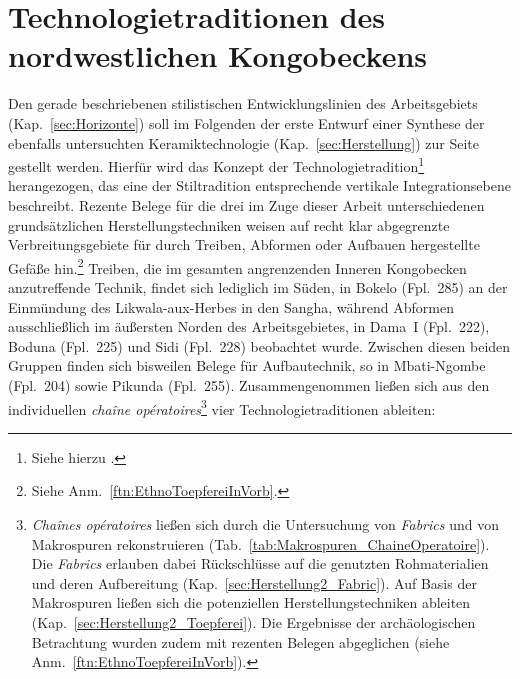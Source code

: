 \section{Technologietraditionen des nordwestlichen Kongobeckens}\label{sec:TechnologieTrad}

Den gerade beschriebenen stilistischen Entwicklungslinien des Arbeitsgebiets (Kap.~\ref{sec:Horizonte}) soll im Folgenden der erste Entwurf einer Synthese der ebenfalls untersuchten Keramiktechnologie (Kap.~\ref{sec:Herstellung}) zur Seite gestellt werden. Hierfür wird das Konzept der Technologietradition\footnote{Siehe hierzu \textcites[31]{Manem.2010}[25, 65--139]{Ard.2014}[10]{vanDoosselaere.2014}.} herangezogen, das eine der Stiltradition entsprechende vertikale Integrationsebene beschreibt. Rezente Belege für die drei im Zuge dieser Arbeit unterschiedenen grundsätzlichen Herstellungstechniken weisen auf recht klar abgegrenzte Verbreitungsgebiete für durch Treiben, Abformen oder Aufbauen hergestellte Gefäße hin.\footnote{Siehe Anm.~\ref{ftn:EthnoToepfereiInVorb}.} Treiben, die im gesamten angrenzenden Inneren Kongobecken anzutreffende Technik, findet sich lediglich im Süden, in Bokelo (Fpl.~285) an der Einmündung des \mbox{Likwala}-\mbox{aux}-\mbox{Herbes} in den \mbox{Sangha}, während Abformen ausschließlich im äußersten Norden des Arbeitsgebietes, in Dama~I (Fpl.~222), Boduna (Fpl.~225) und Sidi (Fpl.~228) beobachtet wurde. Zwischen diesen beiden Gruppen finden sich bisweilen Belege für Aufbautechnik, so in Mbati-Ngombe (Fpl.~204) sowie Pikunda (Fpl.~255). Zusammengenommen ließen sich aus den individuellen \textit{\mbox{chaîne} opératoires}\footnote{\textit{Chaînes opératoires} ließen sich durch die Untersuchung von \textit{Fabrics} und von Makrospuren rekonstruieren (Tab.~\ref{tab:Makrospuren_ChaineOperatoire}). Die \textit{Fabrics} erlauben dabei Rückschlüsse auf die genutzten Rohmaterialien und deren Aufbereitung (Kap.~\ref{sec:Herstellung2_Fabric}). Auf Basis der Makrospuren ließen sich die potenziellen Herstellungstechniken ableiten (Kap.~\ref{sec:Herstellung2_Toepferei}). Die Ergebnisse der archäologischen Betrachtung wurden zudem mit rezenten Belegen abgeglichen (siehe Anm.~\ref{ftn:EthnoToepfereiInVorb}).} vier Technologietraditionen ableiten:

